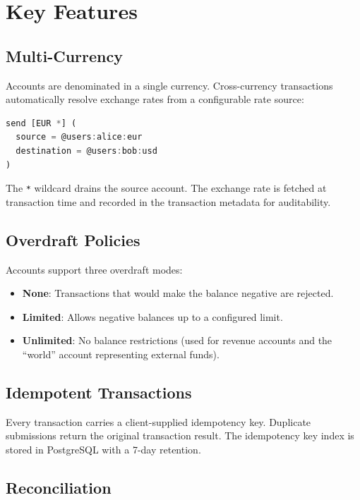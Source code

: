 \documentclass[11pt,twocolumn]{article}
\begin{document}
\section{Key Features}

\subsection{Multi-Currency}

Accounts are denominated in a single currency. Cross-currency transactions automatically resolve exchange rates from a configurable rate source:

\begin{lstlisting}[language=TypeScript]
send [EUR *] (
  source = @users:alice:eur
  destination = @users:bob:usd
)
\end{lstlisting}

The \texttt{*} wildcard drains the source account. The exchange rate is fetched at transaction time and recorded in the transaction metadata for auditability.

\subsection{Overdraft Policies}

Accounts support three overdraft modes:
\begin{itemize}
    \item \textbf{None}: Transactions that would make the balance negative are rejected.
    \item \textbf{Limited}: Allows negative balances up to a configured limit.
    \item \textbf{Unlimited}: No balance restrictions (used for revenue accounts and the ``world'' account representing external funds).
\end{itemize}

\subsection{Idempotent Transactions}

Every transaction carries a client-supplied idempotency key. Duplicate submissions return the original transaction result. The idempotency key index is stored in PostgreSQL with a 7-day retention.

\subsection{Reconciliation}
\end{document}
